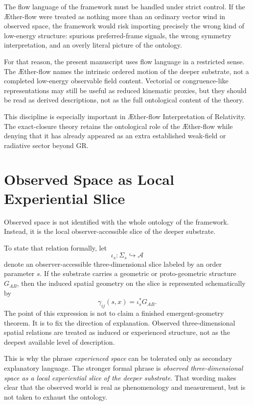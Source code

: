 \documentclass[11pt]{article}
\newcommand{\Aflow}{\AE{}ther-flow}
\newcommand{\TheoryName}{\Aflow{} Interpretation of Relativity}
\newcommand{\Sub}{\mathcal{A}}
\begin{document}
The flow language of the framework must be handled under strict control. If the \Aflow{} were treated as nothing more than an ordinary vector wind in observed space, the framework would risk importing precisely the wrong kind of low-energy structure: spurious preferred-frame signals, the wrong symmetry interpretation, and an overly literal picture of the ontology.

For that reason, the present manuscript uses flow language in a restricted sense. The \Aflow{} names the intrinsic ordered motion of the deeper substrate, not a completed low-energy observable field content. Vectorial or congruence-like representations may still be useful as reduced kinematic proxies, but they should be read as derived descriptions, not as the full ontological content of the theory.

This discipline is especially important in \TheoryName{}. The exact-closure theory retains the ontological role of the \Aflow{} while denying that it has already appeared as an extra established weak-field or radiative sector beyond GR.

\section{Observed Space as Local Experiential Slice}

Observed space is not identified with the whole ontology of the framework. Instead, it is the local observer-accessible slice of the deeper substrate.

To state that relation formally, let
\[
\iota_s:\Sigma_s \hookrightarrow \Sub
\]
denote an observer-accessible three-dimensional slice labeled by an order parameter \(s\). If the substrate carries a geometric or proto-geometric structure \(G_{AB}\), then the induced spatial geometry on the slice is represented schematically by
\[
\gamma_{ij}(s,x) = \iota_s^{*} G_{AB}.
\]
The point of this expression is not to claim a finished emergent-geometry theorem. It is to fix the direction of explanation. Observed three-dimensional spatial relations are treated as induced or experienced structure, not as the deepest available level of description.

This is why the phrase \emph{experienced space} can be tolerated only as secondary explanatory language. The stronger formal phrase is \emph{observed three-dimensional space as a local experiential slice of the deeper substrate}. That wording makes clear that the observed world is real as phenomenology and measurement, but is not taken to exhaust the ontology.
\end{document}

